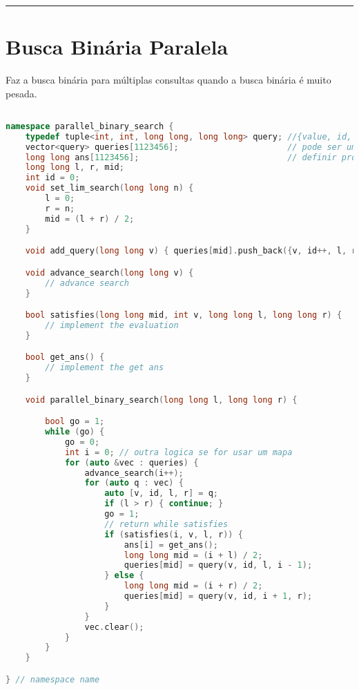 \documentclass[11pt, a4paper, twoside]{book}
\begin{document}
\rule{\textwidth}{0.4pt}

\section{Busca Binária Paralela}



Faz a busca binária para múltiplas consultas quando a busca binária é muito pesada.




\hfill

\begin{lstlisting}[language=C++]

namespace parallel_binary_search {
    typedef tuple<int, int, long long, long long> query; //{value, id, l, r}
    vector<query> queries[1123456];                      // pode ser um mapa se for muito esparso
    long long ans[1123456];                              // definir pro tamanho das queries
    long long l, r, mid;
    int id = 0;
    void set_lim_search(long long n) {
        l = 0;
        r = n;
        mid = (l + r) / 2;
    }

    void add_query(long long v) { queries[mid].push_back({v, id++, l, r}); }

    void advance_search(long long v) {
        // advance search
    }

    bool satisfies(long long mid, int v, long long l, long long r) {
        // implement the evaluation
    }

    bool get_ans() {
        // implement the get ans
    }

    void parallel_binary_search(long long l, long long r) {

        bool go = 1;
        while (go) {
            go = 0;
            int i = 0; // outra logica se for usar um mapa
            for (auto &vec : queries) {
                advance_search(i++);
                for (auto q : vec) {
                    auto [v, id, l, r] = q;
                    if (l > r) { continue; }
                    go = 1;
                    // return while satisfies
                    if (satisfies(i, v, l, r)) {
                        ans[i] = get_ans();
                        long long mid = (i + l) / 2;
                        queries[mid] = query(v, id, l, i - 1);
                    } else {
                        long long mid = (i + r) / 2;
                        queries[mid] = query(v, id, i + 1, r);
                    }
                }
                vec.clear();
            }
        }
    }

} // namespace name
\end{lstlisting}
\end{document}
